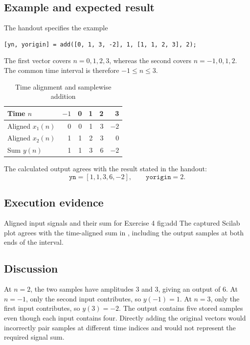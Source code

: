 \subsection{Example and expected result}
The handout specifies the example
\begin{lstlisting}[numbers=none]
[yn, yorigin] = add([0, 1, 3, -2], 1, [1, 1, 2, 3], 2);
\end{lstlisting}
The first vector covers $n=0,1,2,3$, whereas the second covers
$n=-1,0,1,2$. The common time interval is therefore $-1\leq n\leq3$.
\begin{table}[H]
  \centering
  \caption{Time alignment and samplewise addition}
  \label{tab:add}
  \begin{tabular}{lrrrrr}
    \toprule
    Time $n$ & $-1$ & 0 & 1 & 2 & 3\\
    \midrule
    Aligned $x_1(n)$ & 0 & 0 & 1 & 3 & $-2$\\
    Aligned $x_2(n)$ & 1 & 1 & 2 & 3 & 0\\
    Sum $y(n)$ & 1 & 1 & 3 & 6 & $-2$\\
    \bottomrule
  \end{tabular}
\end{table}
The calculated output agrees with the result stated in the handout:
\[
  \texttt{yn}=[1,1,3,6,-2],\qquad \texttt{yorigin}=2.
\]

\subsection{Execution evidence}
  {Aligned input signals and their sum for Exercise 4}
  {fig:add}
The captured Scilab plot agrees with the time-aligned sum in
, including the output samples at both ends of the interval.

\subsection{Discussion}
At $n=2$, the two samples have amplitudes $3$ and $3$, giving an output
of $6$. At $n=-1$, only the second input contributes, so $y(-1)=1$.
At $n=3$, only the first input contributes, so $y(3)=-2$.
The output contains five stored samples even though each input contains
four. Directly adding the original vectors would incorrectly pair
samples at different time indices and would not represent the required
signal sum.
